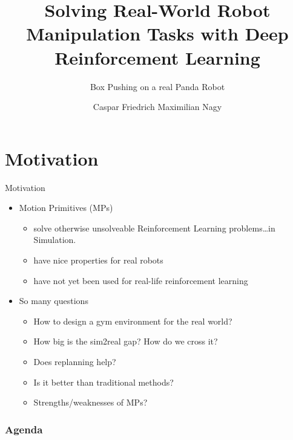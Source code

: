 \documentclass[16:9,en,navbarinfooter]{sdqbeamer}
\author{Caspar Friedrich Maximilian Nagy}
\title{Solving Real-World Robot Manipulation Tasks with Deep Reinforcement Learning}
\subtitle{Box Pushing on a real Panda Robot}
\begin{document}
\KITtitleframe{}


\section{Motivation}
\begin{frame}{Motivation}
\begin{itemize}
    \item Motion Primitives (MPs)
   \begin{itemize}
       \item solve otherwise unsolveable Reinforcement Learning problems\dots in Simulation.
       \item have nice properties for real robots
       \item have not yet been used for real-life reinforcement learning
   \end{itemize}
   \item So many questions
   \begin{itemize}
           \item How to design a gym environment for the real world?
           \item How big is the sim2real gap? How do we cross it?
           \item Does replanning help?
           \item Is it better than traditional methods?
           \item Strengths/weaknesses of MPs? 
   \end{itemize}
\end{itemize}

\end{frame}

\begin{frame}
\frametitle{Agenda}
\tableofcontents
\end{frame}
\end{document}
